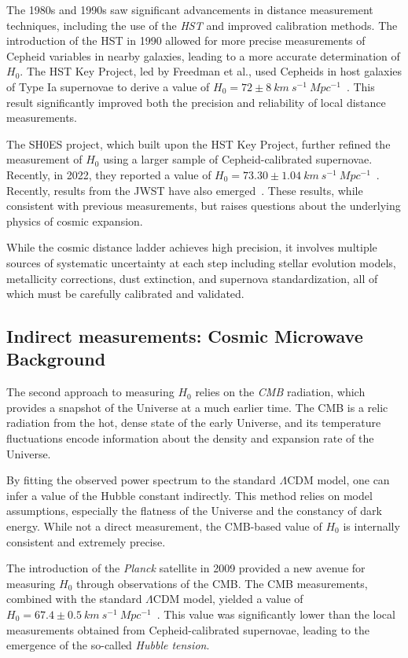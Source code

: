 The 1980s and 1990s saw significant advancements in distance measurement techniques, including the use of the \textit{\ac{HST}} and improved calibration methods. The introduction of the \ac{HST} in 1990 allowed for more precise measurements of Cepheid variables in nearby galaxies, leading to a more accurate determination of $H_0$. The \ac{HST} Key Project, led by Freedman et al., used Cepheids in host galaxies of Type Ia supernovae to derive a value of $H_0 = 72 \pm 8~km~s^{-1}~Mpc^{-1}$~\citep{freedman2001final}. This result significantly improved both the precision and reliability of local distance measurements.

The \ac{SH0ES} project, which built upon the \ac{HST} Key Project, further refined the measurement of $H_0$ using a larger sample of Cepheid-calibrated supernovae. Recently, in 2022, they reported a value of $H_0 = 73.30 \pm 1.04~km~s^{-1}~Mpc^{-1}$~\citep{riess2022comprehensive}. Recently, results from the \ac{JWST} have also emerged~\citep{freedman2024status}. These results, while consistent with previous measurements, but raises questions about the underlying physics of cosmic expansion.

While the cosmic distance ladder achieves high precision, it involves multiple sources of systematic uncertainty at each step including stellar evolution models, metallicity corrections, dust extinction, and supernova standardization, all of which must be carefully calibrated and validated.

\subsection{Indirect measurements: Cosmic Microwave Background}
The second approach to measuring $H_0$ relies on the \textit{\ac{CMB}} radiation, which provides a snapshot of the Universe at a much earlier time. The \ac{CMB} is a relic radiation from the hot, dense state of the early Universe, and its temperature fluctuations encode information about the density and expansion rate of the Universe.

By fitting the observed power spectrum to the standard $\Lambda$CDM model, one can infer a value of the Hubble constant indirectly. This method relies on model assumptions, especially the flatness of the Universe and the constancy of dark energy. While not a direct measurement, the \ac{CMB}-based value of $H_0$ is internally consistent and extremely precise.

The introduction of the \textit{Planck} satellite in 2009 provided a new avenue for measuring $H_0$ through observations of the \ac{CMB}. The \ac{CMB} measurements, combined with the standard $\Lambda$CDM model, yielded a value of $H_0 = 67.4 \pm 0.5~km~s^{-1}~Mpc^{-1}$~\citep{Planck:2018vyg}. This value was significantly lower than the local measurements obtained from Cepheid-calibrated supernovae, leading to the emergence of the so-called \textit{Hubble tension}.

